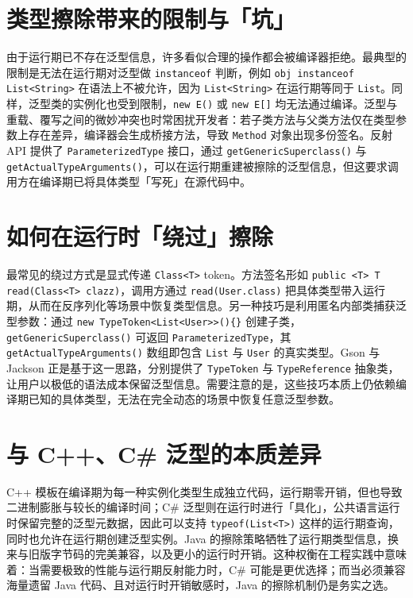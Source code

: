 \chapter{类型擦除带来的限制与「坑」}
由于运行期已不存在泛型信息，许多看似合理的操作都会被编译器拒绝。最典型的限制是无法在运行期对泛型做 \texttt{instanceof} 判断，例如 \texttt{obj instanceof List<String>} 在语法上不被允许，因为 \texttt{List<String>} 在运行期等同于 \texttt{List}。同样，泛型类的实例化也受到限制，\texttt{new E()} 或 \texttt{new E[]} 均无法通过编译。泛型与重载、覆写之间的微妙冲突也时常困扰开发者：若子类方法与父类方法仅在类型参数上存在差异，编译器会生成桥接方法，导致 \texttt{Method} 对象出现多份签名。反射 API 提供了 \texttt{ParameterizedType} 接口，通过 \texttt{getGenericSuperclass()} 与 \texttt{getActualTypeArguments()}，可以在运行期重建被擦除的泛型信息，但这要求调用方在编译期已将具体类型「写死」在源代码中。\par
\chapter{如何在运行时「绕过」擦除}
最常见的绕过方式是显式传递 \texttt{Class<T>} token。方法签名形如 \texttt{public <T> T read(Class<T> clazz)}，调用方通过 \texttt{read(User.class)} 把具体类型带入运行期，从而在反序列化等场景中恢复类型信息。另一种技巧是利用匿名内部类捕获泛型参数：通过 \texttt{new TypeToken<List<User>>()\{{}\}{}} 创建子类，\texttt{getGenericSuperclass()} 可返回 \texttt{ParameterizedType}，其 \texttt{getActualTypeArguments()} 数组即包含 \texttt{List} 与 \texttt{User} 的真实类型。Gson 与 Jackson 正是基于这一思路，分别提供了 \texttt{TypeToken} 与 \texttt{TypeReference} 抽象类，让用户以极低的语法成本保留泛型信息。需要注意的是，这些技巧本质上仍依赖编译期已知的具体类型，无法在完全动态的场景中恢复任意泛型参数。\par
\chapter{与 C++、C\#{} 泛型的本质差异}
C++ 模板在编译期为每一种实例化类型生成独立代码，运行期零开销，但也导致二进制膨胀与较长的编译时间；C\#{} 泛型则在运行时进行「具化」，公共语言运行时保留完整的泛型元数据，因此可以支持 \texttt{typeof(List<T>)} 这样的运行期查询，同时也允许在运行期创建泛型实例。Java 的擦除策略牺牲了运行期类型信息，换来与旧版字节码的完美兼容，以及更小的运行时开销。这种权衡在工程实践中意味着：当需要极致的性能与运行期反射能力时，C\#{} 可能是更优选择；而当必须兼容海量遗留 Java 代码、且对运行时开销敏感时，Java 的擦除机制仍是务实之选。\par
